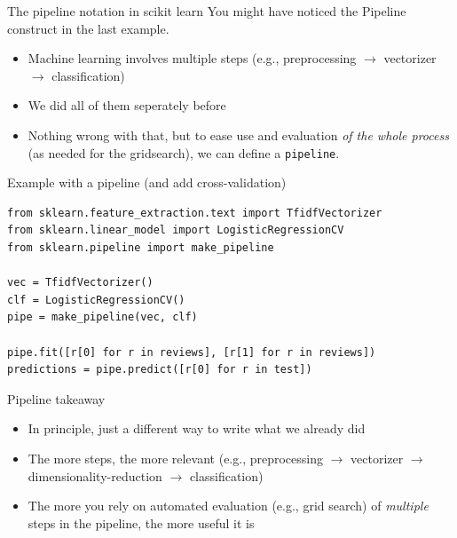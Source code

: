 \documentclass[compress]{beamer}
\begin{document}
\begin{frame}{The pipeline notation in scikit learn}
You might have noticed the Pipeline construct in the last example.
	\begin{itemize}
		\item Machine learning involves multiple steps (e.g., preprocessing $\rightarrow$ vectorizer $\rightarrow$ classification)
		\item We did all of them seperately before
		\item Nothing wrong with that, but to ease use and evaluation \emph{of the whole process} (as needed for the gridsearch), we can define a \texttt{pipeline}.
	\end{itemize}
	
\end{frame}

\begin{frame}[fragile]{Example with a pipeline (and add cross-validation)}
\begin{lstlisting}
from sklearn.feature_extraction.text import TfidfVectorizer
from sklearn.linear_model import LogisticRegressionCV
from sklearn.pipeline import make_pipeline

vec = TfidfVectorizer()
clf = LogisticRegressionCV()
pipe = make_pipeline(vec, clf)

pipe.fit([r[0] for r in reviews], [r[1] for r in reviews])
predictions = pipe.predict([r[0] for r in test])
\end{lstlisting}
\end{frame}

\begin{frame}{Pipeline takeaway}
	\begin{itemize}
		\item In principle, just a different way to write what we already did
		\item The more steps, the more relevant (e.g., preprocessing $\rightarrow$ vectorizer $\rightarrow$ dimensionality-reduction $\rightarrow$ classification)
		\item The more you rely on automated evaluation (e.g., grid search) of \emph{multiple} steps in the pipeline, the more useful it is
	\end{itemize}
\end{frame}
\end{document}
